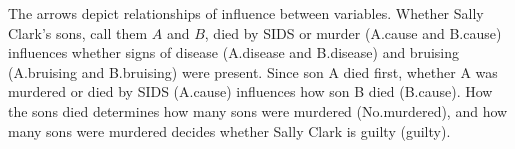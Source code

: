 \documentclass[11pt,dvipsnames,enabledeprecatedfontcommands]{scrartcl}
\begin{document}
\noindent

\begin{minipage}[c]{0.6\linewidth}
\begin{figure}[H]
\end{figure}
\end{minipage} \begin{minipage}[c]{0.35\linewidth}
The arrows depict relationships of influence between variables. Whether Sally Clark's sons, call them \(A\) and \(B\), died by SIDS or murder (\textsf{A.cause} and \textsf{B.cause}) influences whether signs of disease (\textsf{A.disease} and \textsf{B.disease}) and bruising (\textsf{A.bruising} and \textsf{B.bruising})  were present. 
Since son A died first, whether A was murdered or died by SIDS (\textsf{A.cause}) influences how son B died (\textsf{B.cause}). 
How the sons died 
determines how many sons were murdered (\textsf{No.murdered}), and how many sons were murdered decides whether Sally Clark is guilty (\textsf{guilty}). 
\end{minipage}

\vspace{2mm}

\noindent
\end{document}
